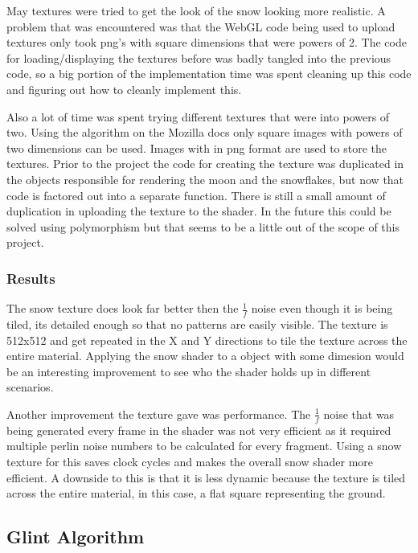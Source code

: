 \documentclass{IEEEtran}
\begin{document}
May textures were tried to get the look of the snow looking more realistic. A problem
that was encountered was that the WebGL code being used to upload textures only took
png's with square dimensions that were powers of 2. The code for loading/displaying the
textures before was badly tangled into the previous code, so a big portion of the
implementation time was spent cleaning up this code and figuring out how to cleanly
implement this.

Also a lot of time was spent trying different textures that were into powers of two.
Using the algorithm on the Mozilla docs \cite{webgl-tex} only square images with powers
of two dimensions can be used. Images with in png format are used to store the textures.
Prior to the project the code for creating the texture was duplicated in the objects
responsible for rendering the moon and the snowflakes, but now that code is factored out
into a separate function. There is still a small amount of duplication in uploading the
texture to the shader. In the future this could be solved using polymorphism but
that seems to be a little out of the scope of this project.

\subsubsection{Results}

The snow texture does look far better then the  \(\frac{1}{f}\) noise even though it is being tiled,
its detailed enough so that no patterns are easily visible. The texture is 512x512 and
get repeated in the X and Y directions to tile the texture across the entire material.
Applying the snow shader to a object with some dimesion would be an interesting
improvement to see who the shader holds up in different scenarios.

Another improvement the texture gave was performance. The \(\frac{1}{f}\) noise that was being generated
every frame in the shader was not very efficient as it required multiple perlin noise numbers
to be calculated for every fragment.  Using a snow texture for this saves clock cycles and makes
the overall snow shader more efficient. A downside to this is that it is less dynamic because
the texture is tiled across the entire material, in this case, a flat square representing the ground.

\subsection{Glint Algorithm}
\end{document}
